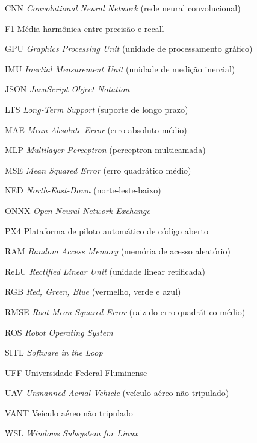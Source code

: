\begin{siglas}
  \item[CNN] \textit{Convolutional Neural Network} (rede neural convolucional)
  \item[F1] Média harmônica entre precisão e recall
  \item[GPU] \textit{Graphics Processing Unit} (unidade de processamento gráfico)
  \item[IMU] \textit{Inertial Measurement Unit} (unidade de medição inercial)
  \item[JSON] \textit{JavaScript Object Notation}
  \item[LTS] \textit{Long-Term Support} (suporte de longo prazo)
  \item[MAE] \textit{Mean Absolute Error} (erro absoluto médio)
  \item[MLP] \textit{Multilayer Perceptron} (perceptron multicamada)
  \item[MSE] \textit{Mean Squared Error} (erro quadrático médio)
  \item[NED] \textit{North-East-Down} (norte-leste-baixo)
  \item[ONNX] \textit{Open Neural Network Exchange}
  \item[PX4] Plataforma de piloto automático de código aberto
  \item[RAM] \textit{Random Access Memory} (memória de acesso aleatório)
  \item[ReLU] \textit{Rectified Linear Unit} (unidade linear retificada)
  \item[RGB] \textit{Red, Green, Blue} (vermelho, verde e azul)
  \item[RMSE] \textit{Root Mean Squared Error} (raiz do erro quadrático médio)
  \item[ROS] \textit{Robot Operating System}
  \item[SITL] \textit{Software in the Loop}
  \item[UFF] Universidade Federal Fluminense
  \item[UAV] \textit{Unmanned Aerial Vehicle} (veículo aéreo não tripulado)
  \item[VANT] Veículo aéreo não tripulado
  \item[WSL] \textit{Windows Subsystem for Linux}
\end{siglas}
